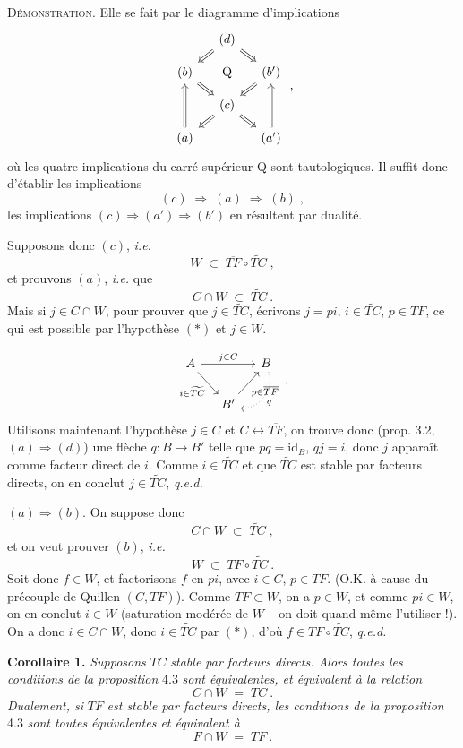 \documentclass[11pt]{article}
\newcommand{\printedpage}[1]{\marginpar{\footnotesize p.~#1}}
\newcommand{\msp}[1]{\marginpar{\footnotesize [#1]}}
\newcommand{\id}{\mathrm{id}}
\begin{document}
\textsc{Démonstration}. Elle se fait par le diagramme d'implications
\[
\begin{tikzcd}[column sep=small, row sep=small]
& (d) \arrow[dl, Rightarrow] \arrow[dr, Rightarrow] & \\
(b) \arrow[dr, Rightarrow] & \mathrm{Q} & (b') \arrow[dl, Rightarrow] \\
& (c) \arrow[dl, Rightarrow] \arrow[dr, Rightarrow] & \\
(a) \arrow[uu, Rightarrow] & & (a') \arrow[uu, Rightarrow]
\end{tikzcd}
\;,
\]
\printedpage{23}
où les quatre implications du carré supérieur Q sont tautologiques. Il suffit donc d'établir les implications
\[
(c) \;\Longrightarrow\; (a) \;\Longrightarrow\; (b)\;,
\]
les implications $(c)\Longrightarrow(a')\Longrightarrow(b')$ en résultent par dualité.

Supposons donc $(c)$, \textit{i.e.}
\[
W \;\subset\; \overline{TF}\circ\widetilde{TC}\;,
\tag*{$(*)$}
\]
et prouvons $(a)$, \textit{i.e.} que
\[
C\cap W \;\subset\; \widetilde{TC}\ .
\]
Mais si $j\in C\cap W$, pour prouver que $j\in\widetilde{TC}$, écrivons $j=pi$, $i\in\widetilde{TC}$, $p\in\overline{TF}$, ce qui est possible par l'hypothèse $(*)$ et $j\in W$.

\msp{page 34}
\[
\begin{tikzcd}[column sep=small]
A \arrow[rr, "j\in C"] \arrow[dr, "i\in\widetilde{TC}"'] & & B \arrow[dl, dotted, bend left=60, "q"] \\
& B' \arrow[ur, "p\in\overline{TF}"'] &
\end{tikzcd}
\;.
\]
Utilisons maintenant l'hypothèse $j\in C$ et $C\longleftrightarrow\overline{TF}$, on trouve donc (prop. 3.2, $(a)\Longrightarrow(d)$) une flèche $q:B\longrightarrow B'$ telle que $pq=\id_B$, $qj=i$, donc $j$ apparaît comme facteur direct de $i$. Comme $i\in\widetilde{TC}$ et que $\widetilde{TC}$ est stable par facteurs directs, on en conclut $j\in\widetilde{TC}$, \quad \textit{q.e.d.}

$(a)\Longrightarrow(b)$. On suppose donc
\[
C\cap W \;\subset\; \widetilde{TC}\;,
\tag*{$(*)$}
\]
et on veut prouver $(b)$, \textit{i.e.}
\[
W \;\subset\; TF\circ\widetilde{TC}\ .
\]
Soit donc $f\in W$, et factorisons $f$ en $pi$, avec $i\in C$, $p\in TF$. (O.K. à cause du précouple de Quillen $(C,TF)$). Comme $TF\subset W$, on a $p\in W$, et comme $pi\in W$, on en conclut $i\in W$ (saturation modérée de $W$ -- on doit quand même l'utiliser !). On a donc $i\in C{\cap}W$, donc $i\in\widetilde{TC}$ par $(*)$, d'où $f\in TF\circ\widetilde{TC}$, \quad \textit{q.e.d.}

\textbf{Corollaire 1.} \textit{Supposons} $TC$ \textit{stable par facteurs directs. Alors toutes les conditions de la proposition} 4.3 \textit{sont équivalentes, et équivalent à la relation}
\[
C\cap W \;=\; TC\ .
\tag*{(4.3.4)}
\]
\textit{Dualement, si} $TF$ \textit{est stable par facteurs directs, les conditions de la proposition} 4.3 \textit{sont toutes équivalentes et équivalent à}
\[
F\cap W \;=\; TF\ .
\tag*{(4.3.4$'$)}
\]
\end{document}

